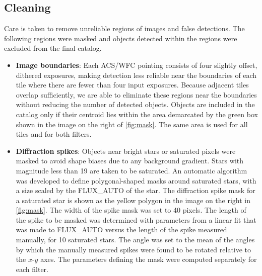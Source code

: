 \documentclass[a4paper,11pt]{article}
\begin{document}
\subsection{Cleaning}
Care is taken to remove unreliable regions of images and false detections. 
The following regions were masked and objects detected within the regions were excluded from the final catalog.
\begin{itemize}
\item \textbf{Image boundaries}: Each ACS/WFC pointing consists of four slightly offset, dithered exposures, making detection less reliable near the boundaries of each tile where there are fewer than four input exposures. Because adjacent tiles overlap sufficiently, we are able to eliminate these regions near the boundaries without reducing the number of detected objects. 
Objects are included in the catalog only if their centroid lies within the area demarcated by the green box shown in the image on the right of \autoref{fig:mask}. The same area is used for all tiles and for both filters.
\item \textbf{Diffraction spikes}: Objects near bright stars or saturated pixels were masked to avoid shape biases due to any background gradient. Stars with magnitude less than 19 are taken to be saturated. An automatic algorithm was developed to define polygonal-shaped masks around saturated stars, with a size scaled by the FLUX\_AUTO of the star. The diffraction spike mask for a saturated star is shown as the yellow polygon in the image on the right in \autoref{fig:mask}. 
The width of the spike mask was set to 40 pixels. The length of the spike to be masked was determined with parameters from a linear fit that was made to FLUX\_AUTO versus the length of the spike measured manually, for 10 saturated stars. The angle was set to the mean of the angles by which the manually measured spikes were found to be rotated relative to the $x$-$y$ axes. The parameters defining the mask were computed separately for each filter.


\end{itemize}
\end{document}
